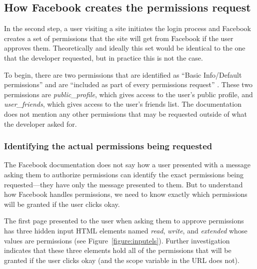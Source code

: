 \documentclass[10pt]{sig-alternate-10pt}
\begin{document}
\subsection{How Facebook creates the permissions request}

In the second step, a user visiting a site initiates the login process and Facebook creates a set of permissions that the site will get from Facebook if the user approves them. Theoretically and ideally this set would be identical to the one that the developer requested, but in practice this is not the case.

To begin, there are two permissions that are identified as ``Basic Info/Default permissions'' and are ``included as part of every permissions request'' \cite{fbpermsinstructions}. These two permissions are \emph{public\_profile}, which gives access to the user's public profile, and \emph{user\_friends}, which gives access to the user's friends list. The documentation does not mention any other permissions that may be requested outside of what the developer asked for.

\subsubsection{Identifying the actual permissions being requested}
\label{sec:inputels}

The Facebook documentation does not say how a user presented with a message asking them to authorize permissions can identify the exact permissions being requested---they have only the message presented to them. But to understand how Facebook handles permissions, we need to know exactly which permissions will be granted if the user clicks okay. 

The first page presented to the user when asking them to approve permissions has three hidden input HTML elements named \emph{read}, \emph{write}, and \emph{extended} whose values are permissions (see Figure~\ref{figure:inputels}). Further investigation indicates that these three elements hold all of the permissions that will be granted if the user clicks okay (and the scope variable in the URL does not).
\end{document}
